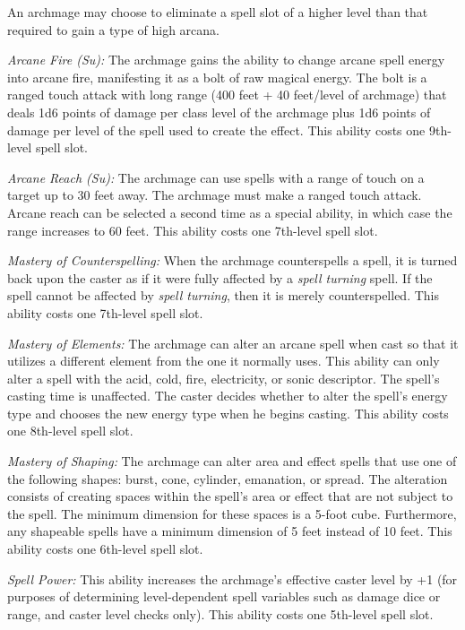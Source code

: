 \documentclass{article}
\begin{document}
An archmage may choose to eliminate a spell slot of a higher level than that required 
to gain a type of high arcana.

\textit{Arcane Fire (Su): }The archmage gains the ability to change arcane spell 
energy into arcane fire, manifesting it as a bolt of raw magical energy. The bolt 
is a ranged touch attack with long range (400 feet + 40 feet/level of archmage) 
that deals 1d6 points of damage per class level of the archmage plus 1d6 points 
of damage per level of the spell used to create the effect. This ability costs 
one 9th-level spell slot.

\textit{Arcane Reach (Su): }The archmage can use spells with a range of touch on 
a target up to 30 feet away. The archmage must make a ranged touch attack. Arcane 
reach can be selected a second time as a special ability, in which case the range 
increases to 60 feet. This ability costs one 7th-level spell slot.

\textit{Mastery of Counterspelling: }When the archmage counterspells a spell, it 
is turned back upon the caster as if it were fully affected by a \textit{spell 
turning }spell. If the spell cannot be affected by \textit{spell turning}, then 
it is merely counterspelled. This ability costs one 7th-level spell slot.

\textit{Mastery of Elements: }The archmage can alter an arcane spell when cast 
so that it utilizes a different element from the one it normally uses. This ability 
can only alter a spell with the acid, cold, fire, electricity, or sonic descriptor. 
The spell's casting time is unaffected. The caster decides whether to alter the 
spell's energy type and chooses the new energy type when he begins casting. This 
ability costs one 8th-level spell slot.

\textit{Mastery of Shaping: }The archmage can alter area and effect spells that 
use one of the following shapes: burst, cone, cylinder, emanation, or spread. The 
alteration consists of creating spaces within the spell's area or effect that are 
not subject to the spell. The minimum dimension for these spaces is a 5-foot cube. 
Furthermore, any shapeable spells have a minimum dimension of 5 feet instead of 
10 feet. This ability costs one 6th-level spell slot.

\textit{Spell Power: }This ability increases the archmage's effective caster level 
by +1 (for purposes of determining level-dependent spell variables such as damage 
dice or range, and caster level checks only). This ability costs one 5th-level 
spell slot.
\end{document}
